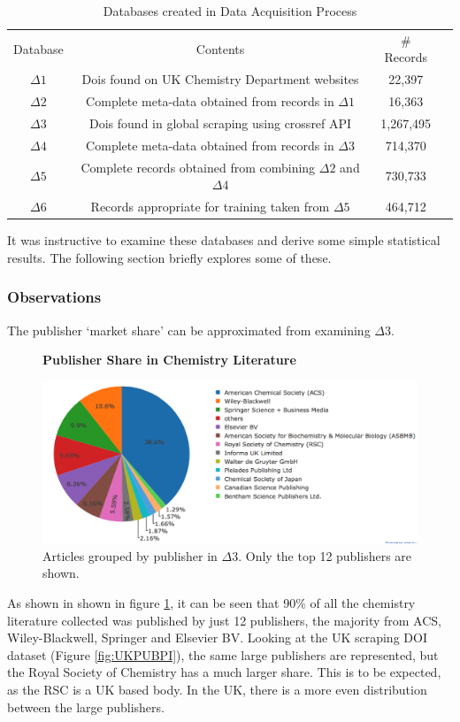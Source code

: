 \begin{table}[H]
\caption{Databases created in Data Acquisition Process}
\label{tab:DATABASES}
\begin{tabular}{||c|c|c|c||}
\hline 
Database &  Contents & \# Records\\
$\Delta1$ & Dois found on UK Chemistry Department websites & 22,397 \\
$\Delta2$ & Complete meta-data obtained from records in $\Delta1$ & 16,363 \\
$\Delta3$ & Dois found in global scraping using crossref API & 1,267,495  \\
$\Delta4$ & Complete meta-data obtained from records in $\Delta3$ & 714,370 \\
$\Delta5$ & Complete records obtained from combining $\Delta2$ and $\Delta4$ & 730,733 \\
$\Delta6$ & Records appropriate for training taken from $\Delta5$ & 464,712 \\
\end{tabular}
\end{table}


It was instructive to examine these databases and derive some simple statistical results. The following section briefly explores some of these.
\subsubsection{Observations}
\label{sec:CORPUSOBSERVATIONS}
The publisher `market share' can be approximated from examining $\Delta3$.
\begin{figure}[H]
    \centering
    \textbf{Publisher Share in Chemistry Literature}\par\medskip
    \includegraphics[width=\textwidth]{Data_Acquisition/publishers_pie.png}
    \caption[Publisher Share in Chemistry Literature]{Articles grouped by publisher in $\Delta3$. Only the top 12 publishers are shown.}
     \label{fig:PUBPI}
\end{figure}
As shown in  shown in figure \ref{fig:PUBPI}, it can be seen that 90\% of all the chemistry literature collected was published by just 12 publishers, the majority from ACS, Wiley-Blackwell, Springer and Elsevier BV. Looking at the UK scraping DOI dataset (Figure \ref{fig:UKPUBPI}), the same large publishers are represented, but the Royal Society of Chemistry has a much larger share. This is to be expected, as the RSC is a UK based body. In the UK, there is a more even distribution between the large publishers. 


